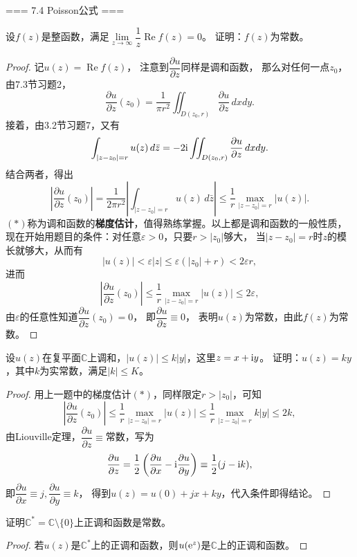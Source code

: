 === 7.4 Poisson公式 ===
\begin{3}
    设$f(z)$是整函数，满足$\lim\limits_{z\to\infty}\dfrac{1}{z}\operatorname{Re}f(z)=0$。
    证明：$f(z)$为常数。
\end{3}
\begin{proof}
    记$u(z)=\operatorname{Re}f(z)$，
    注意到$\dfrac{\partial u}{\partial z}$同样是调和函数，
    那么对任何一点$z_0$，由7.3节习题2，
    \[\frac{\partial u}{\partial z}(z_0)=\frac{1}{\pi r^2}\iint_{D(z_0,r)}\frac{\partial u}{\partial z}\,dxdy.\]
    接着，由3.2节习题7，又有
    \[\int_{|z-z_0|=r}u(z)\,d\bar{z}=-2{\rm i}\iint_{D(z_0,r)}\frac{\partial u}{\partial z}\,dxdy.\]
    结合两者，得出
    \[\left|\frac{\partial u}{\partial z}(z_0)\right|
    =\frac{1}{2\pi r^2}\left|\int_{|z-z_0|=r}u(z)\,d\bar{z}\right|
    \le\frac{1}{r}\max_{|z-z_0|=r}|u(z)|.\tag{$*$}\]
    $(*)$称为调和函数的\textbf{梯度估计}，值得熟练掌握。以上都是调和函数的一般性质，
    现在开始用题目的条件：对任意$\varepsilon>0$，只要$r>|z_0|$够大，
    当$|z-z_0|=r$时$z$的模长就够大，从而有
    \[|u(z)|<\varepsilon|z|\le\varepsilon(|z_0|+r)<2\varepsilon r,\]
    进而
    \[\left|\frac{\partial u}{\partial z}(z_0)\right|
    \le\frac{1}{r}\max_{|z-z_0|=r}|u(z)|\le2\varepsilon,\]
    由$\varepsilon$的任意性知道$\dfrac{\partial u}{\partial z}(z_0)=0$，
    即$\dfrac{\partial u}{\partial z}\equiv0$，
    表明$u(z)$为常数，由此$f(z)$为常数。
\end{proof}

\begin{4}
    设$u(z)$在复平面$\mathbb{C}$上调和，$|u(z)| \le k|y|$，这里$z=x+{\rm i}y$。
    证明：$u(z)=ky$，其中$k$为实常数，满足$|k| \le K$。
\end{4}
\begin{proof}
    用上一题中的梯度估计$(*)$，同样限定$r>|z_0|$，可知
    \[\left|\frac{\partial u}{\partial z}(z_0)\right|
    \le\frac{1}{r}\max_{|z-z_0|=r}|u(z)|
    \le\frac{1}{r}\max_{|z-z_0|=r}k|y|\le2k,\]
    由Liouville定理，$\dfrac{\partial u}{\partial z}\equiv$常数，写为
    \[\frac{\partial u}{\partial z}
    =\frac{1}{2}\left(\frac{\partial u}{\partial x}-{\rm i}\frac{\partial u}{\partial y}\right)
    \equiv\frac{1}{2}(j-{\rm i}k),\]
    即$\dfrac{\partial u}{\partial x}\equiv j,\dfrac{\partial u}{\partial y}\equiv k$，
    得到$u(z)=u(0)+jx+ky$，代入条件即得结论。
\end{proof}

\begin{5}
    证明$\mathbb{C}^*=\mathbb{C}\setminus\{0\}$上正调和函数是常数。
\end{5}
\begin{proof}
    若$u(z)$是$\mathbb{C}^*$上的正调和函数，则$u({\rm e}^z)$是$\mathbb{C}$上的正调和函数。
\end{proof}

